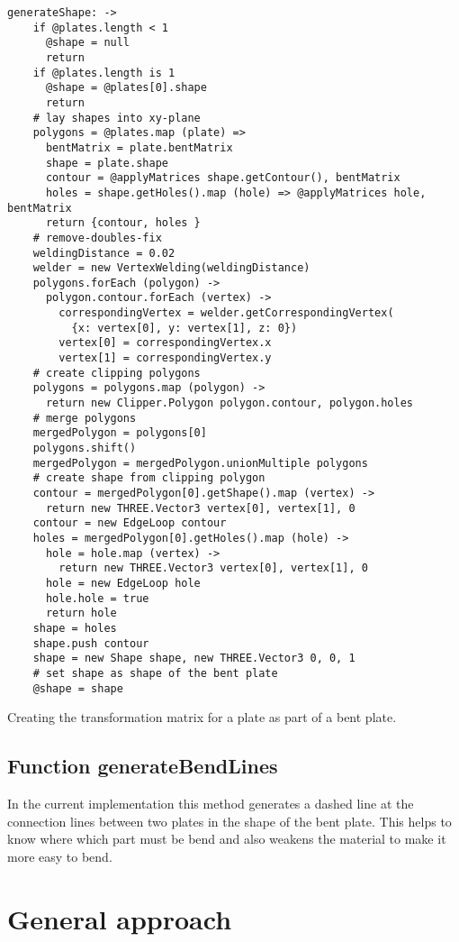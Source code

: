 \documentclass[../ClassicThesis.tex]{subfiles}
\begin{document}
\begin{listing}[ht]
\begin{verbatim}
generateShape: ->
    if @plates.length < 1
      @shape = null
      return
    if @plates.length is 1
      @shape = @plates[0].shape
      return
    # lay shapes into xy-plane
    polygons = @plates.map (plate) =>
      bentMatrix = plate.bentMatrix
      shape = plate.shape
      contour = @applyMatrices shape.getContour(), bentMatrix
      holes = shape.getHoles().map (hole) => @applyMatrices hole, bentMatrix
      return {contour, holes }
    # remove-doubles-fix
    weldingDistance = 0.02
    welder = new VertexWelding(weldingDistance)
    polygons.forEach (polygon) ->
      polygon.contour.forEach (vertex) ->
        correspondingVertex = welder.getCorrespondingVertex(
          {x: vertex[0], y: vertex[1], z: 0})
        vertex[0] = correspondingVertex.x
        vertex[1] = correspondingVertex.y
    # create clipping polygons
    polygons = polygons.map (polygon) ->
      return new Clipper.Polygon polygon.contour, polygon.holes
    # merge polygons
    mergedPolygon = polygons[0]
    polygons.shift()
    mergedPolygon = mergedPolygon.unionMultiple polygons
    # create shape from clipping polygon
    contour = mergedPolygon[0].getShape().map (vertex) ->
      return new THREE.Vector3 vertex[0], vertex[1], 0
    contour = new EdgeLoop contour
    holes = mergedPolygon[0].getHoles().map (hole) ->
      hole = hole.map (vertex) ->
        return new THREE.Vector3 vertex[0], vertex[1], 0
      hole = new EdgeLoop hole
      hole.hole = true
      return hole
    shape = holes
    shape.push contour
    shape = new Shape shape, new THREE.Vector3 0, 0, 1
    # set shape as shape of the bent plate
    @shape = shape
\end{verbatim}
\caption{Creating the transformation matrix for a plate as part of a bent plate.}
\label{lst:generateShape}
\end{listing}

\subsection{Function generateBendLines}

In the current implementation this method generates a dashed line at the connection lines between two plates in the shape of the bent plate. This helps to know where which part must be bend and also weakens the material to make it more easy to bend.

\section{General approach}
\end{document}
